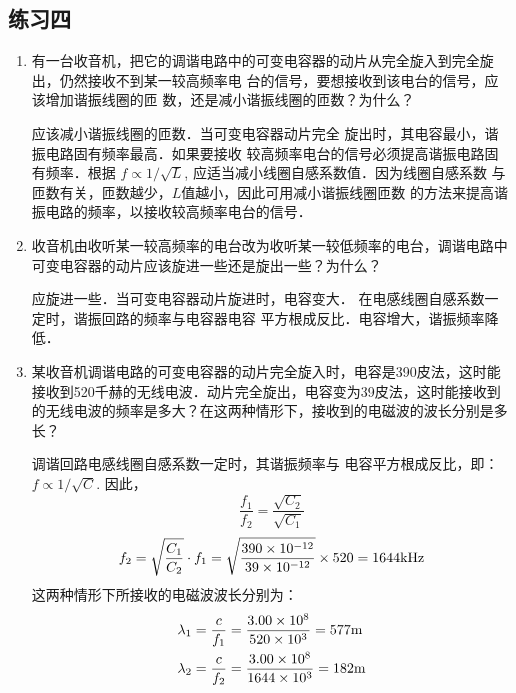 \subsection{练习四}
\begin{enumerate}
	\item 有一台收音机，把它的调谐电路中的可变电容器的动片从完全旋入到完全旋出，仍然接收不到某一较高频率电
	台的信号，要想接收到该电台的信号，应该增加谐振线圈的匝
	数，还是减小谐振线圈的匝数？为什么？

    \begin{solution}
应该减小谐振线圈的匝数．当可变电容器动片完全
旋出时，其电容最小，谐振电路固有频率最高．如果要接收
较高频率电台的信号必须提高谐振电路固有频率．根据
$f\propto 1/\sqrt{L}$, 应适当减小线圈自感系数值．因为线圈自感系数
与匝数有关，匝数越少，$L$值越小，因此可用减小谐振线圈匝数
的方法来提高谐振电路的频率，以接收较高频率电台的信号．
    \end{solution}
    
	\item 收音机由收听某一较高频率的电台改为收听某一较低频率的电台，调谐电路中可变电容器的动片应该旋进一些还是旋出一些？为什么？

    \begin{solution}
    应旋进一些．当可变电容器动片旋进时，电容变大．
在电感线圈自感系数一定时，谐振回路的频率与电容器电容
平方根成反比．电容增大，谐振频率降低．
    \end{solution}
    
	\item 某收音机调谐电路的可变电容器的动片完全旋入时，电容是390皮法，这时能接收到520千赫的无线电波．动片完全旋出，电容变为39皮法，这时能接收到的无线电波的频率是多大？在这两种情形下，接收到的电磁波的波长分别是多长？

    \begin{solution}
调谐回路电感线圈自感系数一定时，其谐振频率与
电容平方根成反比，即：$f\propto 1/\sqrt{C}$. 因此，
\[\frac{f_1}{f_2}=\frac{\sqrt{C_2}}{\sqrt{C_1}}\]
\[f_2=\sqrt{\frac{C_1}{C_2}}\cdot f_1=\sqrt{\frac{390\times 10^{-12}}{39\times 10^{-12}}}\times 520=1644{\rm kHz}\]
这两种情形下所接收的电磁波波长分别为：
\[\begin{split}
\lambda_1&=\frac{c}{f_1}=\frac{3.00\times 10^8}{520\times 10^3}=577{\rm m}\\
\lambda_2&=\frac{c}{f_2}=\frac{3.00\times 10^8}{1644\times 10^3}=182{\rm m}\\
\end{split}\]
    \end{solution}    
\end{enumerate}


